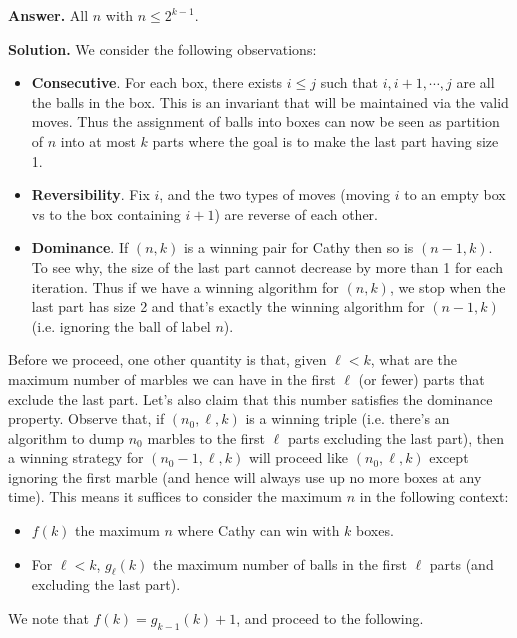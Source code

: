 \documentclass[11pt,a4paper]{article}
\begin{document}
	    \textbf{Answer.} 
	    All $n$ with $n\le 2^{k-1}$. 
	    
	    \textbf{Solution.} 
	    We consider the following observations: 
	    
	    \begin{itemize}
	    	\item \textbf{Consecutive}. 
	    	For each box, there exists $i\le j$ such that $i, i+1, \cdots, j$ are all the balls in the box. 
	    	This is an invariant that will be maintained via the valid moves. 
	    	Thus the assignment of balls into boxes can now be seen as partition of $n$ into at most $k$ parts where the goal is to make the last part having size 1.
	    	
	    	\item \textbf{Reversibility}. 
	    	Fix $i$, and the two types of moves (moving $i$ to an empty box vs to the box containing $i+1$) are reverse of each other. 
	    	
	    	\item \textbf{Dominance}. 
	    	If $(n, k)$ is a winning pair for Cathy then so is $(n-1, k)$. 
	    	To see why, the size of the last part cannot decrease by more than 1 for each iteration. 
	    	Thus if we have a winning algorithm for $(n, k)$, we stop when the last part has size 2 and that's exactly the winning algorithm for $(n-1, k)$ (i.e. ignoring the ball of label $n$). 
	    \end{itemize}
        
        Before we proceed, one other quantity is that, given $\ell<k$, 
        what are the maximum number of marbles we can have in the first $\ell$ (or fewer) parts that exclude the last part. 
        Let's also claim that this number satisfies the dominance property. 
        Observe that, if $(n_0, \ell, k)$ is a winning triple 
        (i.e. there's an algorithm to dump $n_0$ marbles to the first $\ell$ parts excluding the last part), 
        then a winning strategy for $(n_0-1, \ell, k)$ will proceed like $(n_0, \ell, k)$ except ignoring the first marble (and hence will always use up no more boxes at any time). 
        This means it suffices to consider the maximum $n$ in the following context: 
        \begin{itemize}
        	\item $f(k)$ the maximum $n$ where Cathy can win with $k$ boxes. 
        	
        	\item For $\ell<k$, $g_{\ell}(k)$ the maximum number of balls in the first $\ell$ parts (and excluding the last part). 
        \end{itemize}
	    We note that $f(k)=g_{k-1}(k)+1$, and proceed to the following. 
	    
\end{document}
